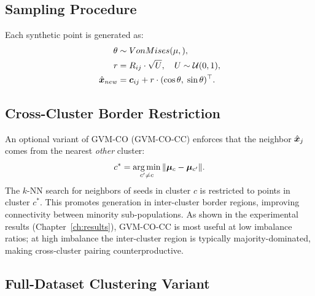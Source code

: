 \subsection{Sampling Procedure}

Each synthetic point is generated as:
\begin{align}
    \theta &\sim VonMises(\mu, ), \label{eq:theta_gvm}\\
    r      &= R_{ij} \cdot \sqrt{U}, \quad U \sim \mathcal{U}(0,1), \label{eq:r_gvm}\\
    \hat{\bm{x}}_{new} &= \bm{c}_{ij} + r \cdot (\cos\theta,\; \sin\theta)^{\top}. \label{eq:x_new_gvm}
\end{align}

\subsection{Cross-Cluster Border Restriction}

An optional variant of GVM-CO (GVM-CO-CC) enforces that the neighbor $\hat{\bm{x}}_j$ comes from the nearest \emph{other} cluster:
\begin{equation}
    c^* = \operatorname*{arg\,min}_{c' \neq c} \|\boldsymbol{\mu}_c - \boldsymbol{\mu}_{c'}\|.
    \label{eq:nearest_cluster}
\end{equation}
The $k$-NN search for neighbors of seeds in cluster $c$ is restricted to points in cluster $c^*$.
This promotes generation in inter-cluster border regions, improving connectivity between minority sub-populations.
As shown in the experimental results (Chapter~\ref{ch:results}), GVM-CO-CC is most useful at low imbalance ratios; at high imbalance the inter-cluster region is typically majority-dominated, making cross-cluster pairing counterproductive.

\subsection{Full-Dataset Clustering Variant}

